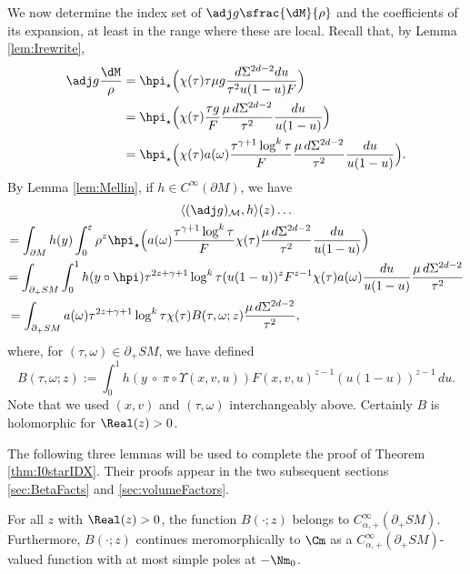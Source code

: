 We now determine the index set of $\adj g \sfrac{\dM}{\rho}$ and the coefficients of its expansion, at least in the range where these are local. Recall that, by Lemma \ref{lem:Irewrite},
\begin{align*}
\adj g \frac{\dM}{\rho} &= \hpi_\star \Bigl(\chi(\tau) \tau \mu g \frac{d\Sigma^{2d-2} du}{\tau^2 u(1-u) F} \Bigr) \\
&= \hpi_\star \Bigl(\chi(\tau) \frac{\tau g}{F} \frac{\mu \, d\Sigma^{2d-2}}{\tau^2} \frac{du}{u(1-u)} \Bigr) \\
&= \hpi_\star \Bigl(\chi(\tau)a(\omega) \frac{\tau^{\gamma+1} \log^k \tau}{F} \frac{\mu \, d\Sigma^{2d-2}}{\tau^2} \frac{du}{u(1-u)} \Bigr).
\end{align*}
By Lemma \ref{lem:Mellin}, if $h\in C^\infty(\partial M)$, we have
\begin{multline}\label{eq:calculation}
\langle (\adj g)_{\cal M}, h \rangle (z) \ldots\\
\hspace*{-2.6cm}= \int_{\partial M} h(y) \int_0^\varepsilon \rho^z \hpi_\star
\Bigl(a(\omega) \frac{\tau^{\gamma+1} \log^k \tau}{F} \chi(\tau) \frac{\mu \, d\Sigma^{2d-2}}{\tau^2} \frac{du}{u(1-u)} \Bigr) \\
= \int_{\partial_+ SM} \int_0^1 h(y\circ \hpi) \tau^{2z+\gamma+1} \log^k \tau (u(1-u))^z F^{z-1} \chi(\tau) a(\omega) \frac{du}{u(1-u)} \frac{\mu \, d\Sigma^{2d-2}}{\tau^2} \\
= \int_{\partial_+ SM} a(\omega) \tau^{2z+\gamma+1} \log^k\tau \chi(\tau) B(\tau,\omega; z) \frac{\mu \, d\Sigma^{2d-2}}{\tau^2},\hspace*{4.5cm}
\end{multline}
where, for $(\tau,\omega)\in \partial_+ SM$, we have defined
\begin{equation}
B(\tau,\omega; z) := \int_0^1 h(y\ \circ\ \pi\circ\Upsilon(x,v,u)) F(x,v,u)^{z-1} (u(1-u))^{z-1}\,du.
\label{eq:B}
\end{equation}
Note that we used $(x,v)$ and $(\tau,\omega)$ interchangeably above. Certainly $B$ is holomorphic for $\Real(z)>0$.

The following three lemmas will be used to complete the proof of Theorem \ref{thm:I0starIDX}.
Their proofs appear in the two subsequent sections \ref{sec:BetaFacts} and \ref{sec:volumeFactors}.

\begin{Lemma}
\label{lem:B}
For all $z$ with $\Real(z)>0$, the function $B(\cdot; z)$ belongs to $C_{\alpha,+}^\infty(\partial_+ SM)$. Furthermore,
$B(\cdot; z)$ continues meromorphically to $\Cm$ as a $C_{\alpha,+}^\infty(\partial_+ SM)$-valued function with at most simple poles at $-\Nm_0$.
\end{Lemma}

